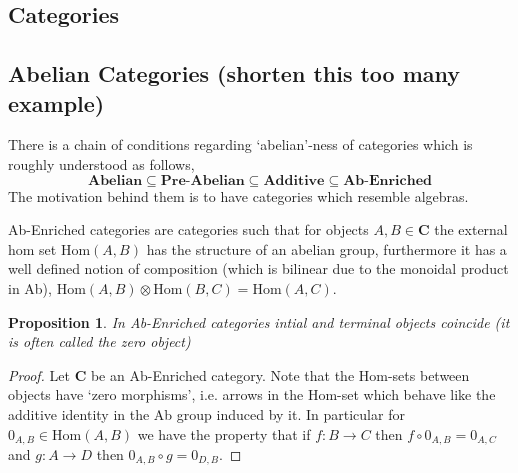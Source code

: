 \documentclass[12pt]{article}
\numberwithin{equation}{section}
\newcommand{\Hom}{{\mathrm{Hom}}}
\newcounter{dummy} \numberwithin{dummy}{section}
\newtheorem{proposition}[dummy]{Proposition}
\begin{document}
\begin{appendices}
	\section{Categories}
	\subsection{Abelian Categories (shorten this too many example)}
	There is a chain of conditions regarding `abelian'-ness of categories which is roughly understood as follows,
	\[ \textbf{Abelian} \subseteq \textbf{Pre-Abelian} \subseteq \textbf{Additive} \subseteq \textbf{Ab-Enriched}\]
	The motivation behind them is to have categories which resemble algebras.
	
	Ab-Enriched categories are categories such that for objects $A,B \in \mathbf{C}$ the external hom set $\Hom(A,B)$ has the structure of an abelian group, furthermore it has a well defined notion of composition (which is bilinear due to the monoidal product in Ab), $\Hom(A,B)\otimes \Hom(B,C) =\Hom(A,C)$. 
	\begin{proposition}
		In Ab-Enriched categories intial and terminal objects coincide (it is often called the zero object)
	\end{proposition}
	\begin{proof}
		Let $\mathbf{C}$ be an Ab-Enriched category. Note that the Hom-sets between objects have `zero morphisms', i.e. arrows in the Hom-set which behave like the additive identity in the Ab group induced by it. In particular for $0_{A,B}\in \Hom(A,B)$ we have the property that if $f:B \to C$ then $f\circ 0_{A,B}=0_{A,C}$ and $g: A \to D$ then $0_{A,B}\circ g=0_{D,B}$.
		

\end{proof}
\end{appendices}
\end{document}
